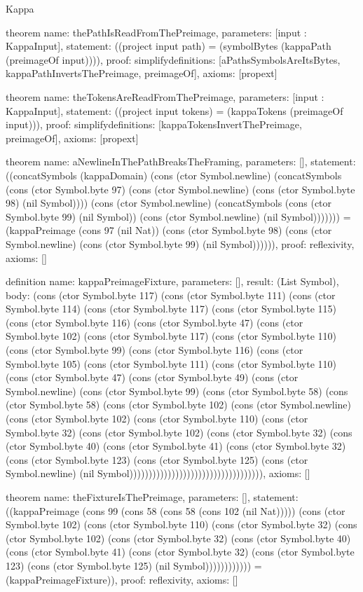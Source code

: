 \begin{lexlean}{Kappa}
\begin{semanticmodule}
theorem{
  name: thePathIsReadFromThePreimage,
  parameters: [input : KappaInput],
  statement: ((project input path) = (symbolBytes (kappaPath (preimageOf input)))),
  proof: simplify{definitions: [aPathsSymbolsAreItsBytes, kappaPathInvertsThePreimage, preimageOf]},
  axioms: [propext]
}

theorem{
  name: theTokensAreReadFromThePreimage,
  parameters: [input : KappaInput],
  statement: ((project input tokens) = (kappaTokens (preimageOf input))),
  proof: simplify{definitions: [kappaTokensInvertThePreimage, preimageOf]},
  axioms: [propext]
}

theorem{
  name: aNewlineInThePathBreaksTheFraming,
  parameters: [],
  statement: ((concatSymbols (kappaDomain) (cons (ctor Symbol.newline) (concatSymbols (cons (ctor Symbol.byte 97) (cons (ctor Symbol.newline) (cons (ctor Symbol.byte 98) (nil Symbol)))) (cons (ctor Symbol.newline) (concatSymbols (cons (ctor Symbol.byte 99) (nil Symbol)) (cons (ctor Symbol.newline) (nil Symbol))))))) = (kappaPreimage (cons 97 (nil Nat)) (cons (ctor Symbol.byte 98) (cons (ctor Symbol.newline) (cons (ctor Symbol.byte 99) (nil Symbol)))))),
  proof: reflexivity{},
  axioms: []
}

definition{
  name: kappaPreimageFixture,
  parameters: [],
  result: (List Symbol),
  body: (cons (ctor Symbol.byte 117) (cons (ctor Symbol.byte 111) (cons (ctor Symbol.byte 114) (cons (ctor Symbol.byte 117) (cons (ctor Symbol.byte 115) (cons (ctor Symbol.byte 116) (cons (ctor Symbol.byte 47) (cons (ctor Symbol.byte 102) (cons (ctor Symbol.byte 117) (cons (ctor Symbol.byte 110) (cons (ctor Symbol.byte 99) (cons (ctor Symbol.byte 116) (cons (ctor Symbol.byte 105) (cons (ctor Symbol.byte 111) (cons (ctor Symbol.byte 110) (cons (ctor Symbol.byte 47) (cons (ctor Symbol.byte 49) (cons (ctor Symbol.newline) (cons (ctor Symbol.byte 99) (cons (ctor Symbol.byte 58) (cons (ctor Symbol.byte 58) (cons (ctor Symbol.byte 102) (cons (ctor Symbol.newline) (cons (ctor Symbol.byte 102) (cons (ctor Symbol.byte 110) (cons (ctor Symbol.byte 32) (cons (ctor Symbol.byte 102) (cons (ctor Symbol.byte 32) (cons (ctor Symbol.byte 40) (cons (ctor Symbol.byte 41) (cons (ctor Symbol.byte 32) (cons (ctor Symbol.byte 123) (cons (ctor Symbol.byte 125) (cons (ctor Symbol.newline) (nil Symbol))))))))))))))))))))))))))))))))))),
  axioms: []
}

theorem{
  name: theFixtureIsThePreimage,
  parameters: [],
  statement: ((kappaPreimage (cons 99 (cons 58 (cons 58 (cons 102 (nil Nat))))) (cons (ctor Symbol.byte 102) (cons (ctor Symbol.byte 110) (cons (ctor Symbol.byte 32) (cons (ctor Symbol.byte 102) (cons (ctor Symbol.byte 32) (cons (ctor Symbol.byte 40) (cons (ctor Symbol.byte 41) (cons (ctor Symbol.byte 32) (cons (ctor Symbol.byte 123) (cons (ctor Symbol.byte 125) (nil Symbol)))))))))))) = (kappaPreimageFixture)),
  proof: reflexivity{},
  axioms: []
}
\end{semanticmodule}
\end{lexlean}

